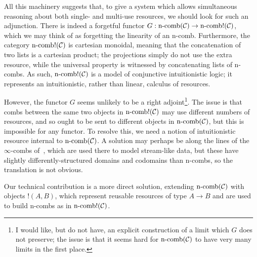 All this machinery suggests that, to give a system which allows simultaneous
reasoning about both single- and multi-use resources, we should look for
such an adjunction. There is indeed a forgetful functor $G: \operatorname*{n-comb}({\mathcal{C}})\to
\operatorname*{n-comb!}({\mathcal{C}})$, which we may think of as forgetting the linearity of an
n-comb. Furthermore, the category $\operatorname*{n-comb!}({\mathcal{C}})$ is cartesian monoidal,
meaning that the concatenation of two lists is a cartesian product; the
projections simply do not use the extra resource, while the universal property is
witnessed by concatenating lists of n-combs. As such, $\operatorname*{n-comb!}({\mathcal{C}})$ is a
model of conjunctive intuitionistic logic; it represents an intuitionistic,
rather than linear, calculus of resources.

However, the functor $G$ seems unlikely to be a right adjoint\footnote{
  I would like, but do not have, an explicit construction of a limit which $G$
  does not preserve; the issue is that it seems hard for $\operatorname*{n-comb}({\mathcal{C}})$ to
  have very many limits in the first place.
}. The issue is that combs between the same two objects in $\operatorname*{n-comb!}({\mathcal{C}})$ may
use different numbers of resources, and so ought to be sent to different objects
in $\operatorname*{n-comb}({\mathcal{C}})$, but this is impossible for any functor. To resolve this,
we need a notion of intuitionistic resource internal to $\operatorname*{n-comb}({\mathcal{C}})$. A solution
may perhaps be along the lines of the $\infty$-combs of~\cite{roman-2020}, which
are used there to model stream-like data, but these have slightly
differently-structured domains and codomains than n-combs, so the translation is
not obvious.

Our technical contribution is a more direct solution, extending
$\operatorname*{n-comb}({\mathcal{C}})$ with objects $!(A, B)$, which represent reusable resources of
type $A\to B$ and are used to build n-combs as in $\operatorname*{n-comb!}({\mathcal{C}})$.

